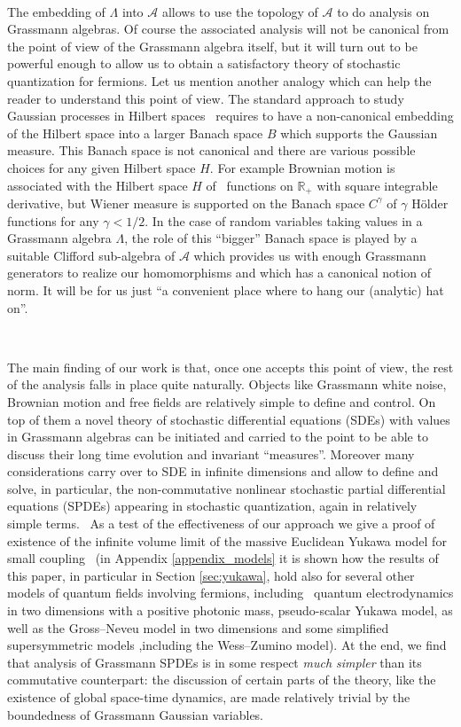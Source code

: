 \documentclass{article}
\newcommand{\tmtextit}[1]{{\itshape{#1}}}
\begin{document}
\

The embedding of $\Lambda$ into $\mathcal{A}$ allows to use the topology of
$\mathcal{A}$ to do analysis on Grassmann algebras. Of course the associated
analysis will not be canonical from the point of view of the Grassmann algebra
itself, but it will turn out to be powerful enough to allow us to obtain a
satisfactory theory of stochastic quantization for fermions. Let us mention
another analogy which can help the reader to understand this point of view.
The standard approach to study Gaussian processes in Hilbert
spaces~{\cite{Gross1967,janson_gaussian_1997,hida_white_2013}} requires to
have a non-canonical embedding of the Hilbert space into a larger Banach space
$B$ which supports the Gaussian measure. This Banach space is not canonical
and there are various possible choices for any given Hilbert space $H$. For
example Brownian motion is associated with the Hilbert space $H$ of \
functions on $\mathbb{R}_+$ with square integrable derivative, but Wiener
measure is supported on the Banach space $C^{\gamma}$ of $\gamma$ H{\"o}lder
functions for any $\gamma < 1 / 2$. In the case of random variables taking
values in a Grassmann algebra $\Lambda$, the role of this ``bigger'' Banach
space is played by a suitable Clifford sub-algebra of $\mathcal{A}$ which
provides us with enough Grassmann generators to realize our homomorphisms and
which has a canonical notion of norm. It will be for us just ``a convenient
place where to hang our (analytic) hat on''.

\

The main finding of our work is that, once one accepts this point of view,
the rest of the analysis falls in place quite naturally. Objects like
Grassmann white noise, Brownian motion and free fields are relatively simple
to define and control. On top of them a novel theory of stochastic
differential equations (SDEs) with values in Grassmann algebras can be
initiated and carried to the point to be able to discuss their long time
evolution and invariant ``measures''. Moreover many considerations carry over
to SDE in infinite dimensions and allow to define and solve, in particular,
the non-commutative nonlinear stochastic partial differential equations
(SPDEs) appearing in stochastic quantization, again in relatively simple
terms. \ As a test of the effectiveness of our approach we give a proof of
existence of the infinite volume limit of the massive Euclidean Yukawa model
for small
coupling~{\cite{osterwalder_euclidean_1973,osterwalder_euclidean_1973-2,lesniewski_effective_1987}}
(in Appendix \ref{appendix_models} it is shown how the results of this paper,
in particular in Section \ref{sec:yukawa}, hold also for several other models
of quantum fields involving fermions, including \ quantum electrodynamics in
two dimensions with a positive photonic mass, pseudo-scalar Yukawa model, as
well as the Gross--Neveu model in two dimensions and some simplified
supersymmetric models ,including the Wess--Zumino model). At the end, we find
that analysis of Grassmann SPDEs is in some respect \tmtextit{much simpler}
than its commutative counterpart: the discussion of certain parts of the
theory, like the existence of global space-time dynamics, are made relatively
trivial by the boundedness of Grassmann Gaussian variables.
\end{document}
